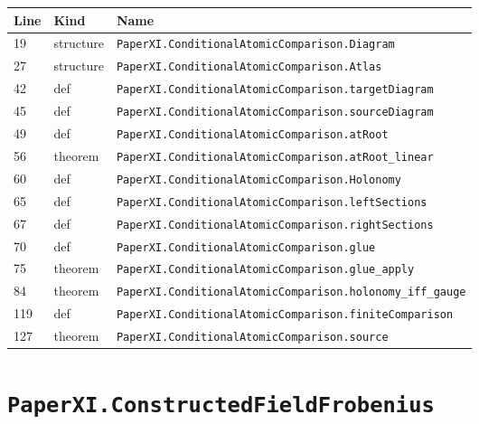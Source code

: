 \documentclass[10pt,oneside]{book}
\begin{document}
\begin{longtable}{@{}p{}p{}p{}@{}}\toprule Line&Kind&Name\\\midrule\endhead

19&structure&\nolinkurl{PaperXI.ConditionalAtomicComparison.Diagram}\\

27&structure&\nolinkurl{PaperXI.ConditionalAtomicComparison.Atlas}\\

42&def&\nolinkurl{PaperXI.ConditionalAtomicComparison.targetDiagram}\\

45&def&\nolinkurl{PaperXI.ConditionalAtomicComparison.sourceDiagram}\\

49&def&\nolinkurl{PaperXI.ConditionalAtomicComparison.atRoot}\\

56&theorem&\nolinkurl{PaperXI.ConditionalAtomicComparison.atRoot_linear}\\

60&def&\nolinkurl{PaperXI.ConditionalAtomicComparison.Holonomy}\\

65&def&\nolinkurl{PaperXI.ConditionalAtomicComparison.leftSections}\\

67&def&\nolinkurl{PaperXI.ConditionalAtomicComparison.rightSections}\\

70&def&\nolinkurl{PaperXI.ConditionalAtomicComparison.glue}\\

75&theorem&\nolinkurl{PaperXI.ConditionalAtomicComparison.glue_apply}\\

84&theorem&\nolinkurl{PaperXI.ConditionalAtomicComparison.holonomy_iff_gauge}\\

119&def&\nolinkurl{PaperXI.ConditionalAtomicComparison.finiteComparison}\\

127&theorem&\nolinkurl{PaperXI.ConditionalAtomicComparison.source}\\

\bottomrule\end{longtable}

\section{\texorpdfstring{\nolinkurl{PaperXI.ConstructedFieldFrobenius}}{PaperXI.ConstructedFieldFrobenius}}\label{module:PaperXI.ConstructedFieldFrobenius}
\end{document}
